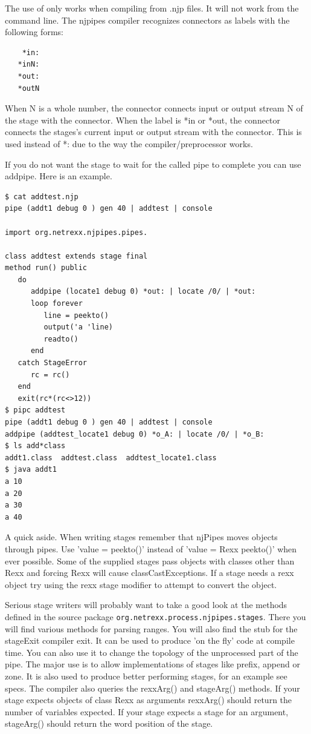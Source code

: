 The use of {} only works when compiling from .njp files.  It will not work from the command line.
The njpipes compiler recognizes connectors as labels with the following forms:
\begin{lstlisting}
    *in:
   *inN:
   *out:
   *outN
\end{lstlisting}

When N is a whole number, the connector connects input or output stream N of the stage with the connector.
When the label is *in or *out, the connector connects the stages's current input or output stream
with the connector.  This is used instead of *: due to the way the compiler/preprocessor works.

If you do not want the stage to wait for the called pipe to complete you can use addpipe.
Here is an example.
\begin{lstlisting}
$ cat addtest.njp
pipe (addt1 debug 0 ) gen 40 | addtest | console

import org.netrexx.njpipes.pipes.

class addtest extends stage final
method run() public
   do
      addpipe (locate1 debug 0) *out: | locate /0/ | *out:
      loop forever
         line = peekto()
         output('a 'line)
         readto()
      end
   catch StageError
      rc = rc()
   end
   exit(rc*(rc<>12))
$ pipc addtest
pipe (addt1 debug 0 ) gen 40 | addtest | console
addpipe (addtest_locate1 debug 0) *o_A: | locate /0/ | *o_B:
$ ls add*class
addt1.class  addtest.class  addtest_locate1.class
$ java addt1
a 10
a 20
a 30
a 40
\end{lstlisting}

A quick aside.  When writing stages remember that njPipes moves objects through pipes.
Use 'value = peekto()' instead of 'value = Rexx peekto()' when ever possible.
Some of the supplied stages pass objects with classes other than Rexx and
forcing Rexx will cause classCastExceptions.
If a stage needs a rexx object try using the rexx stage modifier to attempt to convert the object.

Serious stage writers will probably want to take a good look at the
methods defined in the \nr{} source package \texttt{org.netrexx.process.njpipes.stages}.
There you will find various methods for parsing ranges.
You will also find the stub for the stageExit compiler exit.
It can be used to produce 'on the fly' code at compile time.
You can also use it to change the topology of the unprocessed part of the pipe.
The major use is to allow implementations of stages like prefix, append or zone.
It is also used to produce better performing stages, for an example see specs.
The compiler also queries the rexxArg() and stageArg() methods.
If your stage expects objects of class Rexx as arguments rexxArg()
should return the number of variables expected.
If your stage expects a stage for an argument, stageArg() should return the word position of the stage.

